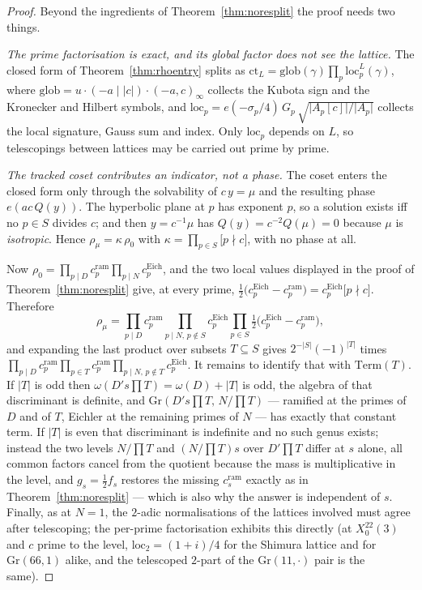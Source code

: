 \documentclass[11pt,reqno]{amsart}
\theoremstyle{plain}
\theoremstyle{definition}
\begin{document}
\begin{proof}
Beyond the ingredients of Theorem~\ref{thm:noresplit} the proof needs two things.

\emph{The prime factorisation is exact, and its global factor does not see the lattice.}
The closed form of Theorem~\ref{thm:rhoentry} splits as
$\mathrm{ct}_L=\mathrm{glob}(\gamma)\prod_p\mathrm{loc}^L_p(\gamma)$, where
$\mathrm{glob}=u\cdot(-a\mid\lvert c\rvert)\cdot(-a,c)_\infty$ collects the Kubota sign
and the Kronecker and Hilbert symbols, and
$\mathrm{loc}_p=e(-\sigma_p/4)\,G_p\,\sqrt{\lvert A_p[c]\rvert/\lvert A_p\rvert}$ collects
the local signature, Gauss sum and index. Only $\mathrm{loc}_p$ depends on $L$, so
telescopings between lattices may be carried out prime by prime.

\emph{The tracked coset contributes an indicator, not a phase.} The coset enters the
closed form only through the solvability of $c\,y=\mu$ and the resulting phase
$e(ac\,Q(y))$. The hyperbolic plane at $p$ has exponent $p$, so a solution exists iff no
$p\in S$ divides $c$; and then $y=c^{-1}\mu$ has $Q(y)=c^{-2}Q(\mu)=0$ because $\mu$ is
\emph{isotropic}. Hence $\rho_\mu=\kappa\,\rho_0$ with
$\kappa=\prod_{p\in S}\bigl[p\nmid c\bigr]$, with no phase at all.

Now $\rho_0=\prod_{p\mid D}c_p^{\mathrm{ram}}\prod_{p\mid N}c_p^{\mathrm{Eich}}$, and the
two local values displayed in the proof of Theorem~\ref{thm:noresplit} give, at every
prime, $\tfrac12\bigl(c_p^{\mathrm{Eich}}-c_p^{\mathrm{ram}}\bigr)
=c_p^{\mathrm{Eich}}\bigl[p\nmid c\bigr]$. Therefore
\[
  \rho_\mu=\prod_{p\mid D}c_p^{\mathrm{ram}}
    \prod_{p\mid N,\,p\notin S}c_p^{\mathrm{Eich}}
    \prod_{p\in S}\tfrac12\bigl(c_p^{\mathrm{Eich}}-c_p^{\mathrm{ram}}\bigr),
\]
and expanding the last product over subsets $T\subseteq S$ gives $2^{-\lvert S\rvert}
(-1)^{\lvert T\rvert}$ times $\prod_{p\mid D}c_p^{\mathrm{ram}}\prod_{p\in T}
c_p^{\mathrm{ram}}\prod_{p\mid N,\,p\notin T}c_p^{\mathrm{Eich}}$. It remains to identify
that with $\mathrm{Term}(T)$. If $\lvert T\rvert$ is odd then
$\omega(D's\prod T)=\omega(D)+\lvert T\rvert$ is odd, the algebra of that discriminant is
definite, and $\mathrm{Gr}(D's\prod T,\,N/\prod T)$ --- ramified at the primes of $D$ and
of $T$, Eichler at the remaining primes of $N$ --- has exactly that constant term. If
$\lvert T\rvert$ is even that discriminant is indefinite and no such genus exists;
instead the two levels $N/\prod T$ and $(N/\prod T)s$ over $D'\prod T$ differ at $s$
alone, all common factors cancel from the quotient because the mass is multiplicative in
the level, and $g_s=\tfrac12 f_s$ restores the missing $c_s^{\mathrm{ram}}$ exactly as in
Theorem~\ref{thm:noresplit} --- which is also why the answer is independent of $s$.
Finally, as at $N=1$, the $2$-adic normalisations of the lattices involved must agree
after telescoping; the per-prime factorisation exhibits this directly (at $X_0^{22}(3)$
and $c$ prime to the level, $\mathrm{loc}_2=(1+i)/4$ for the Shimura lattice and for
$\mathrm{Gr}(66,1)$ alike, and the telescoped $2$-part of the $\mathrm{Gr}(11,\cdot)$ pair
is the same).
\end{proof}
\end{document}

